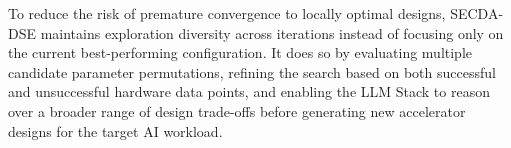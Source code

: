 
To reduce the risk of premature convergence to locally optimal designs, SECDA-DSE maintains exploration diversity across iterations instead of focusing only on the current best-performing configuration. It does so by evaluating multiple candidate parameter permutations, refining the search based on both successful and unsuccessful hardware data points, and enabling the LLM Stack to reason over a broader range of design trade-offs before generating new accelerator designs for the target AI workload.
